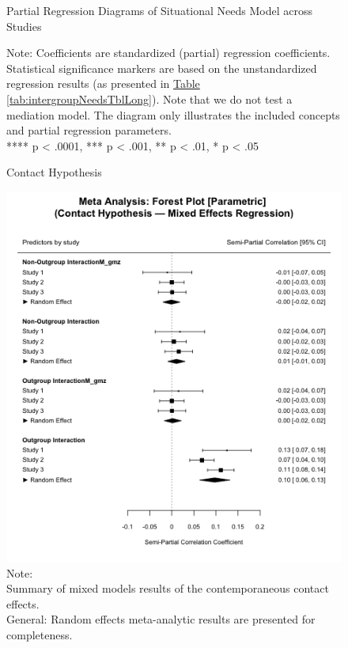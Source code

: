 \documentclass[man, 12pt, a4paper, mask]{apa7}
\theoremstyle{break}
\theoremstyle{plain}
\newcommand{\tblref}[2][]{\hyperref[#2]{Table \ref*{#2}#1}}
\begin{document}
\begin{figure}
  \caption{Partial Regression Diagrams of Situational Needs Model across Studies}
  \label{fig:MainPaths}
  \begin{center}
    
  \end{center}
  \caption*{Note: Coefficients are standardized (partial) regression coefficients. Statistical significance markers are based on the unstandardized regression results (as presented in \tblref{tab:intergroupNeedsTblLong}). Note that we do not test a mediation model. The diagram only illustrates the included concepts and partial regression parameters.\\
  **** p < .0001, *** p < .001, ** p < .01, * p < .05}
\end{figure}

\begin{figure}
  \caption{Contact Hypothesis}
  \label{fig:ContactHypothesis}
  \centering\includegraphics[width=\textwidth]{Figures/forestParametricREMLGeneralLmer.png}
  \caption*{Note: \\
  Summary of mixed models results of the contemporaneous contact effects.\\
  General: Random effects meta-analytic results are presented for completeness.}
\end{figure}
\end{document}
